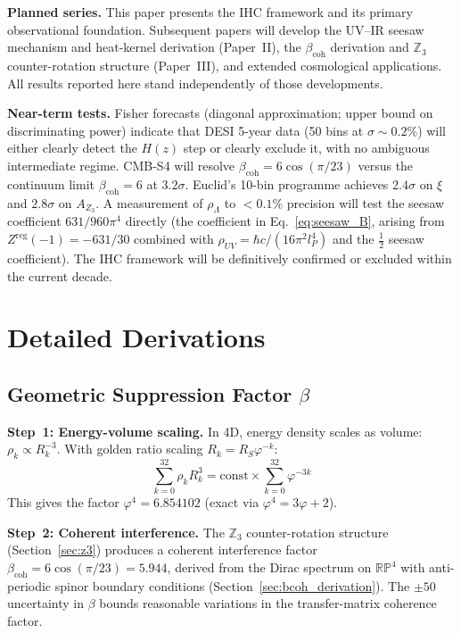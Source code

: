 \documentclass[12pt,a4paper]{article}
\begin{document}
\textbf{Planned series.} This paper presents the IHC framework and its primary
observational foundation. Subsequent papers will develop the UV--IR seesaw
mechanism and heat-kernel derivation (Paper~II), the $\beta_\mathrm{coh}$
derivation and $\mathbb{Z}_3$ counter-rotation structure (Paper~III), and
extended cosmological applications. All results reported here stand independently
of those developments.

\textbf{Near-term tests.} Fisher forecasts (diagonal approximation; upper bound on
discriminating power) indicate that DESI 5-year data (50 bins at $\sigma \sim 0.2\%$)
will either clearly detect the $H(z)$ step or clearly exclude it, with no ambiguous
intermediate regime. CMB-S4 will resolve $\beta_\mathrm{coh} = 6\cos(\pi/23)$ versus the continuum
limit $\beta_\mathrm{coh} = 6$ at $3.2\sigma$. Euclid's 10-bin programme achieves
$2.4\sigma$ on $\xi$ and $2.8\sigma$ on $A_{Z_3}$. A measurement of $\rho_\Lambda$
to $<0.1\%$ precision will test the seesaw coefficient $631/960\pi^4$ directly
(the coefficient in Eq.~\ref{eq:seesaw_B}, arising from $Z^\mathrm{reg}(-1) = -631/30$
combined with $\rho_{UV} = \hbar c/(16\pi^2 l_P^4)$ and the $\tfrac{1}{2}$ seesaw coefficient).
The IHC framework will be definitively confirmed or excluded within the current decade.

\appendix

\section{Detailed Derivations}
\label{app:beta}

\subsection{Geometric Suppression Factor $\beta$}

\textbf{Step~1: Energy-volume scaling.} In 4D, energy density scales as volume:
$\rho_k \propto R_k^{-3}$. With golden ratio scaling $R_k = R_S\varphi^{-k}$:
\begin{equation}
  \sum_{k=0}^{32} \rho_k R_k^3 = \mathrm{const} \times \sum_{k=0}^{32} \varphi^{-3k}
\end{equation}
This gives the factor $\varphi^4 = 6.854102$ (exact via $\varphi^4 = 3\varphi + 2$).

\textbf{Step~2: Coherent interference.} The $\mathbb{Z}_3$ counter-rotation structure
(Section~\ref{sec:z3}) produces a coherent interference factor
$\beta_\mathrm{coh} = 6\cos(\pi/23) = 5.944$, derived from the Dirac spectrum on
$\mathbb{RP}^4$ with anti-periodic spinor boundary conditions
(Section~\ref{sec:bcoh_derivation}). The $\pm 50$ uncertainty in $\beta$ bounds
reasonable variations in the transfer-matrix coherence factor.
\end{document}
